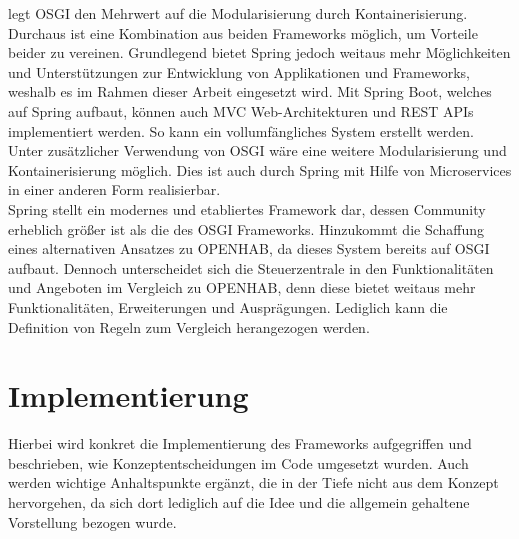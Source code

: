         legt \acs{OSGI} den Mehrwert auf die Modularisierung durch Kontainerisierung. Durchaus ist eine Kombination aus beiden 
        Frameworks möglich, um Vorteile beider zu vereinen. Grundlegend bietet Spring jedoch weitaus mehr Möglichkeiten und Unterstützungen 
        zur Entwicklung von Applikationen und Frameworks, weshalb es im Rahmen dieser Arbeit eingesetzt wird. Mit Spring Boot, welches auf Spring 
        aufbaut, können auch \acl{MVC} Web-Architekturen und \acs{REST} \acs{API}s implementiert werden. So kann 
        ein vollumfängliches System erstellt werden. Unter zusätzlicher Verwendung von \acs{OSGI} wäre eine weitere Modularisierung und Kontainerisierung möglich. Dies 
        ist auch durch Spring mit Hilfe von Microservices in einer anderen Form realisierbar. 
        \\
        \linebreak
        Spring stellt ein modernes und etabliertes Framework dar, dessen Community erheblich größer ist als die des \acs{OSGI} Frameworks. 
        Hinzukommt die Schaffung eines alternativen Ansatzes zu \acs{OPENHAB}, da dieses System bereits 
        auf \acs{OSGI} aufbaut. 
        Dennoch unterscheidet sich die Steuerzentrale in den Funktionalitäten und Angeboten im Vergleich zu \acs{OPENHAB}, denn diese bietet weitaus mehr 
        Funktionalitäten, Erweiterungen und Ausprägungen. Lediglich kann die Definition von Regeln zum Vergleich herangezogen werden. 

\section{Implementierung}
\label{sec:implementation}
    Hierbei wird konkret die Implementierung des Frameworks aufgegriffen und beschrieben, wie Konzeptentscheidungen im Code umgesetzt wurden. 
    Auch werden wichtige Anhaltspunkte ergänzt, die in der Tiefe nicht aus dem Konzept hervorgehen, da sich dort lediglich auf die Idee und die allgemein gehaltene 
    Vorstellung bezogen wurde. 

